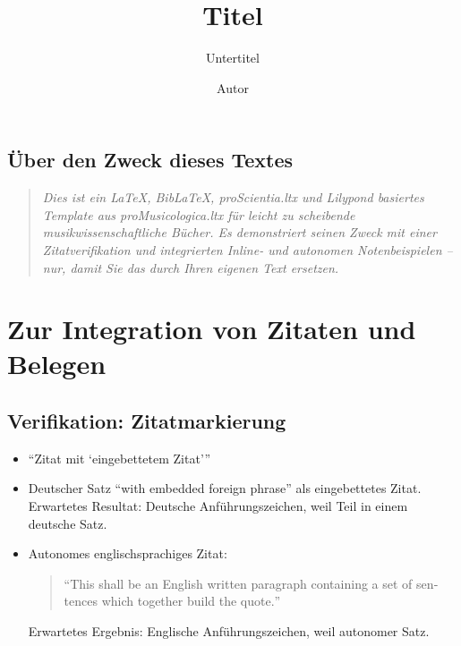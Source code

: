 \documentclass[
  DIV=calc,
  BCOR=5mm,
  11pt,
  headings=small,
  oneside,
  abstract=true,
  toc=bib,
  english,ngerman]{scrbook}
\begin{document}
\nocite{*}

\titlehead{Klassifikation}
\subject{Release }
\title{Titel}
\subtitle{Untertitel}
\author{Autor}

\maketitle
\footnotesize
\tableofcontents
\normalsize

\section{Über den Zweck dieses Textes}
\begin{quote}
\itshape
Dies ist ein \emph{\LaTeX}, \emph{Bib\LaTeX}, \emph{proScientia.ltx} und \emph{Lilypond} basiertes Template aus \emph{proMusicologica.ltx} für leicht zu scheibende musikwissenschaftliche Bücher. Es demonstriert seinen Zweck mit einer Zitatverifikation und integrierten Inline- und autonomen Notenbeispielen -- nur, damit Sie das durch Ihren eigenen Text ersetzen.
\end{quote}

\chapter{Zur Integration von Zitaten und Belegen}

\section{Verifikation: Zitatmarkierung}

\begin{itemize}

  \item \enquote{Zitat mit \enquote{eingebettetem Zitat}}

  \item Deutscher Satz \foreignquote{german}{with embedded foreign phrase}
  als eingebettetes Zitat. Erwartetes Resultat: Deutsche Anführungszeichen,
  weil Teil in einem deutsche Satz.

  \item Autonomes englischsprachiges Zitat:
  \begin{quote}
    \foreignquote{english}{This shall be an English written paragraph containing
    a set of sentences which together build the quote.}
  \end{quote}
  Erwartetes Ergebnis: Englische Anführungszeichen, weil autonomer Satz.
\end{itemize}
\end{document}
